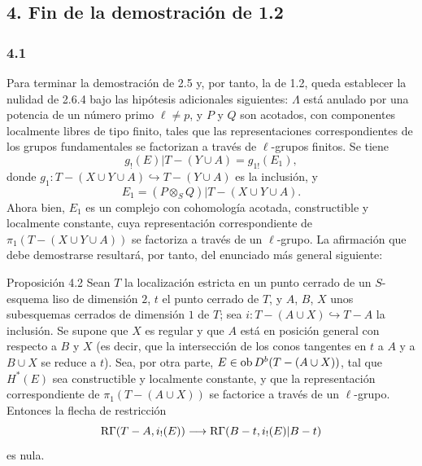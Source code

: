 \subsection*{4. Fin de la demostración de 1.2}

\subsubsection*{4.1}
Para terminar la demostración de 2.5 y, por tanto, la de 1.2, queda establecer la nulidad de 2.6.4 bajo las hipótesis adicionales siguientes: $\Lambda$ está anulado por una potencia de un número primo $\ell\ne p$, y $P$ y $Q$ son acotados, con componentes localmente libres de tipo finito, tales que las representaciones correspondientes de los grupos fundamentales se factorizan a través de $\ell$-grupos finitos. Se tiene
\[
g_!(E)|T-(Y\cup A)=g_{1!}(E_1),
\]
donde $g_1:T-(X\cup Y\cup A)\hookrightarrow T-(Y\cup A)$ es la inclusión, y
\[
E_1=(P\otimes_S Q)|T-(X\cup Y\cup A).
\]
Ahora bien, $E_1$ es un complejo con cohomología acotada, constructible y localmente constante, cuya representación correspondiente de $\pi_1(T-(X\cup Y\cup A))$ se factoriza a través de un $\ell$-grupo. La afirmación que debe demostrarse resultará, por tanto, del enunciado más general siguiente:

\begin{statement}{Proposición 4.2}
Sean $T$ la localización estricta en un punto cerrado de un $S$-esquema liso de dimensión $2$, $t$ el punto cerrado de $T$, y $A$, $B$, $X$ unos subesquemas cerrados de dimensión $1$ de $T$; sea $i:T-(A\cup X)\hookrightarrow T-A$ la inclusión. Se supone que $X$ es regular y que $A$ está en posición general con respecto a $B$ y $X$ (es decir, que la intersección de los conos tangentes en $t$ a $A$ y a $B\cup X$ se reduce a $t$). Sea, por otra parte, $E\in\operatorname{ob} D^b(T-(A\cup X))$, tal que $H^*(E)$ sea constructible y localmente constante, y que la representación correspondiente de $\pi_1(T-(A\cup X))$ se factorice a través de un $\ell$-grupo. Entonces la flecha de restricción
\[
\mathrm{R}\Gamma(T-A,i_!(E))
\longrightarrow
\mathrm{R}\Gamma(B-t,i_!(E)|B-t)
\]
es nula.
\end{statement}
